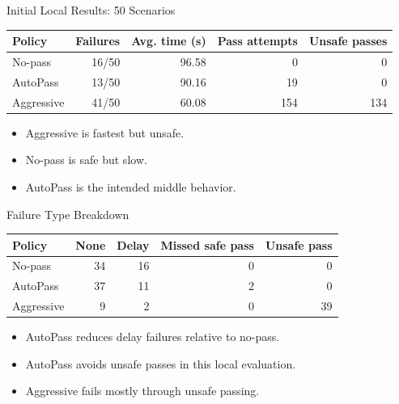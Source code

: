 \documentclass[aspectratio=169,11pt]{beamer}
\begin{document}
\begin{frame}{Initial Local Results: 50 Scenarios}
\begin{center}
\small
\begin{tabular}{lrrrr}
\toprule
Policy & Failures & Avg. time (s) & Pass attempts & Unsafe passes \\
\midrule
No-pass & 16/50 & 96.58 & 0 & 0 \\
AutoPass & 13/50 & 90.16 & 19 & 0 \\
Aggressive & 41/50 & 60.08 & 154 & 134 \\
\bottomrule
\end{tabular}
\end{center}

\vspace{10pt}

\begin{itemize}
\item Aggressive is fastest but unsafe.
\item No-pass is safe but slow.
\item AutoPass is the intended middle behavior.
\end{itemize}
\end{frame}

\begin{frame}{Failure Type Breakdown}
\begin{center}
\small
\begin{tabular}{lrrrr}
\toprule
Policy & None & Delay & Missed safe pass & Unsafe pass \\
\midrule
No-pass & 34 & 16 & 0 & 0 \\
AutoPass & 37 & 11 & 2 & 0 \\
Aggressive & 9 & 2 & 0 & 39 \\
\bottomrule
\end{tabular}
\end{center}

\vspace{10pt}

\begin{itemize}
\item AutoPass reduces delay failures relative to no-pass.
\item AutoPass avoids unsafe passes in this local evaluation.
\item Aggressive fails mostly through unsafe passing.
\end{itemize}
\end{frame}
\end{document}
